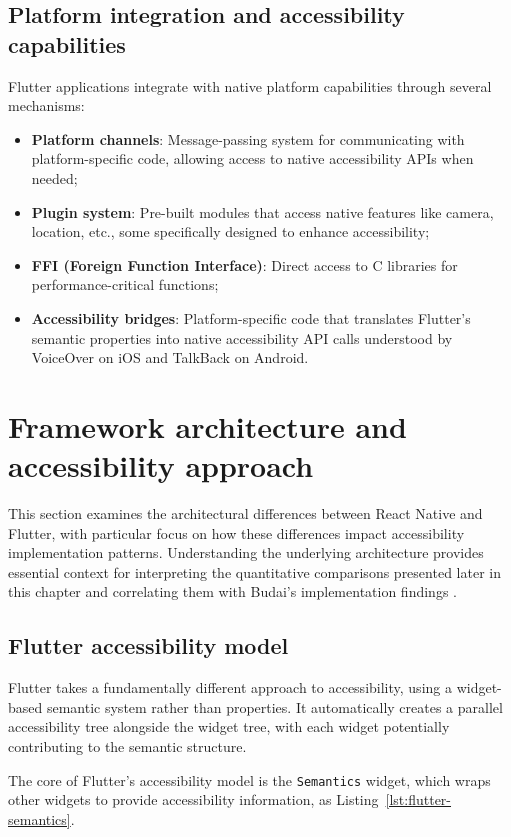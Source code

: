 \subsection{Platform integration and accessibility capabilities}
Flutter applications integrate with native platform capabilities through several mechanisms:
\begin{itemize}
    \item \textbf{Platform channels}: Message-passing system for communicating with platform-specific code, allowing access to native accessibility APIs when needed;
    \item \textbf{Plugin system}: Pre-built modules that access native features like camera, location, etc., some specifically designed to enhance accessibility;
    \item \textbf{FFI (Foreign Function Interface)}: Direct access to C libraries for performance-critical functions;
    \item \textbf{Accessibility bridges}: Platform-specific code that translates Flutter's semantic properties into native accessibility API calls understood by VoiceOver on iOS and TalkBack on Android.
\end{itemize}

\section{Framework architecture and accessibility approach}
\label{sec:framework-architecture}

This section examines the architectural differences between React Native and Flutter, with particular focus on how these differences impact accessibility implementation patterns. Understanding the underlying architecture provides essential context for interpreting the quantitative comparisons presented later in this chapter and correlating them with Budai's implementation findings \cite{budai2024mobile}.

\subsection{Flutter accessibility model}
Flutter takes a fundamentally different approach to accessibility, using a widget-based semantic system rather than properties. It automatically creates a parallel accessibility tree alongside the widget tree, with each widget potentially contributing to the semantic structure.

The core of Flutter's accessibility model is the \texttt{Semantics} widget, which wraps other widgets to provide accessibility information, as Listing~\ref{lst:flutter-semantics}.

